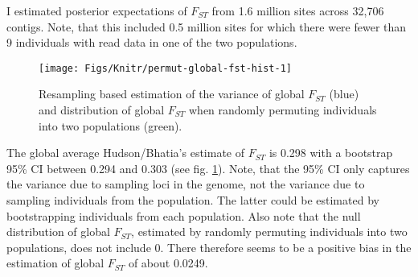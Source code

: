 \documentclass[a4paper,12pt,times,authoryear,twoside,print,index]{Classes/PhDThesisPSnPDF}\usepackage[]{graphicx}\usepackage[]{color}
\newenvironment{knitrout}{}{} %
\begin{document}
I estimated posterior expectations of $F_{ST}$ from 1.6 million sites across 32,706 contigs. Note, that this included 0.5 million sites for which there were fewer than 9 individuals with read data in one of the two populations.
%
\begin{figure}[htb]
\centering
\begin{knitrout}
\color{fgcolor}

{\centering \texttt{[image: Figs/Knitr/permut-global-fst-hist-1]} 

}



\end{knitrout}
\caption{Resampling based estimation of the variance of global $F_{ST}$ (blue) and distribution of global $F_{ST}$ when randomly permuting individuals into two populations (green).}
\label{Fig:global-fst}
\end{figure}
%
The global average Hudson/Bhatia's estimate of $F_{ST}$ is 0.298 with a bootstrap 95\% \gls{CI} between 0.294 and 0.303 (see fig. \ref{Fig:global-fst}). Note, that the 95\% \gls{CI} only captures the variance due to sampling loci in the genome, not the variance due to sampling individuals from the population. The latter could be estimated by bootstrapping individuals from each population. Also note that the null distribution of global $F_{ST}$, estimated by randomly permuting individuals into two populations, does not include 0. There therefore seems to be a positive bias in the estimation of global $F_{ST}$ of about 0.0249.
\end{document}
